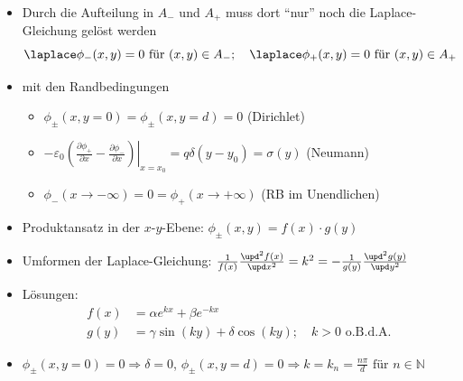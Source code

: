 \begin{frame}
  \begin{itemize}[<+->]
  \item Durch die Aufteilung in $A_-$ und $A_+$ muss dort \enquote{nur} noch die Laplace-Gleichung gelöst werden
    $$
    \laplace \phi_-  (x,y) = 0 \text{ für } (x,y) \in A_- ;\quad \laplace \phi_+ (x,y) = 0 \text{ für } (x,y) \in A_+ 
    $$
  \item mit den Randbedingungen
    \begin{itemize}[<+->]
    \item $\phi_\pm (x, y=0) = \phi_\pm(x,y=d) = 0 $ (Dirichlet)
    \item $\left. -\varepsilon_0\left( \frac{\partial \phi_+}{\partial x} -\frac{\partial \phi_-}{\partial x} \right)\right|_{x=x_0} = q\delta(y-y_0)=\sigma(y)$ (Neumann)
      \item $\phi_-(x\to-\infty) = 0 = \phi_+(x\to+\infty) $ (RB im Unendlichen) 
      \end{itemize}
    \item Produktansatz in der $x$-$y$-Ebene: $\phi_\pm(x,y) = f(x)\cdot g(y)$
    \item Umformen der Laplace-Gleichung: $\frac{1}{f(x)}\frac{\upd^2 f(x)}{\upd x^2}  = k^2 =  -\frac{1}{g(y)}\frac{\upd^2 g(y)}{\upd y^2}$
    \item Lösungen:
      \begin{align*}
        f(x) &= \alpha e^{kx} + \beta e^{-kx} \\
        g(y) &= \gamma\sin(ky) + \delta\cos(ky); \quad k>0 \text{ o.B.d.A.}
      \end{align*}
      \item $\phi_\pm(x,y=0) = 0 \Rightarrow \boxed{\delta=0}$, $\phi_\pm(x,y=d) = 0 \Rightarrow \boxed{k=k_n = \frac{n\pi}{d}} \text{ für } n\in\mathbb{N}$
  \end{itemize}
\end{frame}
